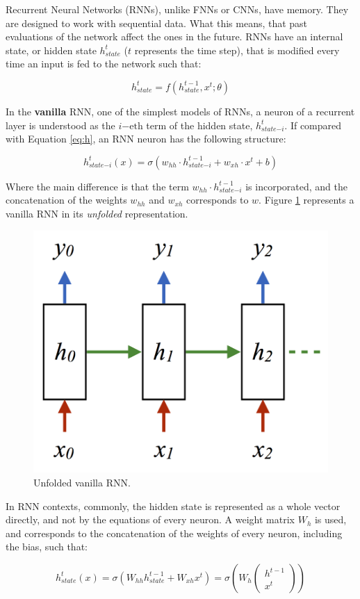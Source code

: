 \begin{enumerate}
Recurrent Neural Networks (RNNs), unlike FNNs or CNNs, have memory. They are designed to work with sequential data. What this means, that past evaluations of the network affect the ones in the future. RNNs have an internal state, or hidden state $h_{state}^{t}$ ($t$ represents the time step), that is modified every time an input is fed to the network such that:

\begin{equation}
    h_{state}^{t} = f(h_{state}^{t-1}, x^{t}; \theta)
\end{equation}

In the \textbf{vanilla} RNN, one of the simplest models of RNNs, a neuron of a recurrent layer is understood as the $i\mathrm{-eth}$ term of the hidden state, $h_{state\mathrm{-}i}^{t}$. If compared with Equation \ref{eq:h}, an RNN neuron has the following structure:

\begin{equation}
    h_{state\mathrm{-}i}^{t}(x) = \sigma(w_{hh} \cdot h_{state\mathrm{-}i}^{t-1} + w_{xh} \cdot x^{t} + b)
\end{equation}

Where the main difference is that the term $w_{hh} \cdot h_{state\mathrm{-}i}^{t-1}$ is incorporated, and the concatenation of the weights $w_{hh}$ and $w_{xh}$ corresponds to $w$. Figure \ref{fig:rnn_unfolded} represents a vanilla RNN in its \emph{unfolded} representation.

\begin{figure}[h]
    \centering
    \includegraphics[width=0.3\linewidth]{imagenes/cap1/unfolded_rnn.png}
    \caption{Unfolded vanilla RNN.}
    \label{fig:rnn_unfolded}
\end{figure}


In RNN contexts, commonly, the hidden state is represented as a whole vector directly, and not by the equations of every neuron. A weight matrix $W_{h}$ is used, and corresponds to the concatenation of the weights of every neuron, including the bias, such that:

\begin{equation}
    h_{state}^{t}(x) = \sigma(W_{hh} h_{state}^{t-1} + W_{xh} x^{t}) = \sigma \left(W_{h} \begin{pmatrix} h^{t-1} \\ x^{t} \end{pmatrix} \right)
\end{equation}


\end{enumerate}
